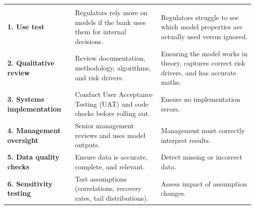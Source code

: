 
\noindent\begin{minipage}{\textwidth}
\renewcommand{\arraystretch}{1.3}
\begin{tabularx}{\textwidth}{@{}L{0.24\textwidth}YY@{}}
  &  & \\
{\tabfont \textbf{1. Use test}} & {\tabfont Regulators rely more on models if the bank uses them for internal decisions.} & {\tabfont Regulators struggle to see which model properties are actually used versus ignored.}\\
{\tabfont \textbf{2. Qualitative review}} & {\tabfont Review documentation, methodology, algorithms, and risk drivers.} & {\tabfont Ensuring the model works in theory, captures correct risk drivers, and has accurate maths.}\\
{\tabfont \textbf{3. Systems implementation}} & {\tabfont Conduct User Acceptance Testing (UAT) and code checks before rolling out.} & {\tabfont Ensure no implementation errors.}\\
{\tabfont \textbf{4. Management oversight}} & {\tabfont Senior management reviews and uses model outputs.} & {\tabfont Management must correctly interpret results.}\\
{\tabfont \textbf{5. Data quality checks}} & {\tabfont Ensure data is accurate, complete, and relevant.} & {\tabfont Detect missing or incorrect data.}\\
{\tabfont \textbf{6. Sensitivity testing}} & {\tabfont Test assumptions (correlations, recovery rates, tail distributions).} & {\tabfont Assess impact of assumption changes.}\\
\end{tabularx}
\end{minipage}


